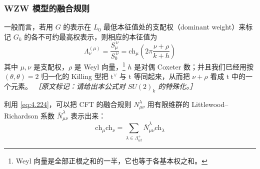 
\subsubsection{WZW 模型的融合规则} %

一般而言，若用 $G$ 的表示在 $L_0$ 最低本征值处的支配权（dominant weight）来标记 $G_k$ 的各不可约最高权表示，则相应的本征值为
\begin{equation}
  \Lambda^{(\mu)}_\nu=\frac{S_\mu^{\ \nu}}{S_0^{\ \nu}}=\mathrm{ch}_\mu\left(2\pi\frac{\nu+\rho}{k+h}\right)
  \tag{4.224}
  \label{eq:4.224}
\end{equation}
其中 $\mu,\nu$ 是支配权，$\rho$ 是 Weyl 向量，\footnote{Weyl 向量是全部正根之和的一半，它也等于各基本权之和。} $h$ 是对偶 Coxeter 数；并且我们已经用按 $(\theta,\theta)=2$ 归一化的 Killing 型把 $\mathrm{t}^{\vee}$ 与 $\mathrm{t}$ 等同起来，从而把 $\nu+\rho$ 看成 $\mathrm{t}$ 中的一个元素。
{\small\itshape ［原文标记：请给出本公式对 $SU(2)_k$ 的特殊化。］}

利用 \eqref{eq:4.224}，可以把 CFT 的融合规则 $N^{\lambda}_{\mu\nu}$ 用有限维群的 Littlewood–Richardson 系数 $\bar N^{\lambda}_{\mu\nu}$ 表示出来：
\begin{equation}
  \mathrm{ch}_\mu\mathrm{ch}_\nu=\sum_{\lambda\in\Lambda^{+}_{wt}}\bar N^{\lambda}_{\mu\nu}\mathrm{ch}_\lambda
  \tag{4.225}
  \label{eq:4.225}
\end{equation}

